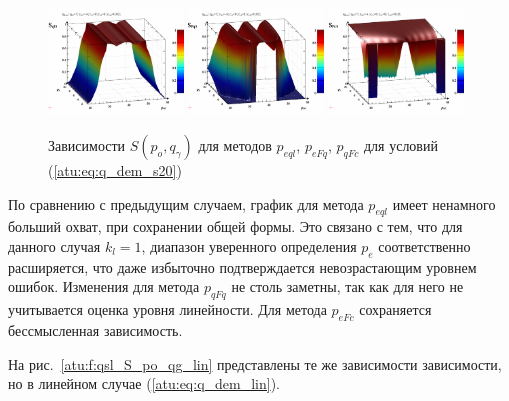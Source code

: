 \begin{figure}[htb!]
  \centerline{
    \includegraphics[width=0.32\textwidth]{p/qls_pe-p_po_qg_Sql_s20.png}
    \hfill
    \includegraphics[width=0.32\textwidth]{p/qls_pe-p_po_qg_SFq_s20.png}
    \hfill
    \includegraphics[width=0.32\textwidth]{p/qls_pe-p_po_qg_SFc_s20.png}
  }
  \caption{Зависимости $S(p_o,q_\gamma)$ для методов $p_{eql}$, $p_{eFq}$, $p_{qFc}$ для условий (\ref{atu:eq:q_dem_s20})}
  \label{atu:f:qsl_S_po_qg_s20}
\end{figure}

По сравнению с предыдущим случаем, график для метода $p_{eql}$
имеет ненамного больший охват, при сохранении общей формы.
Это связано с тем, что для данного случая $k_l=1$,
диапазон уверенного определения $p_e$ соответственно расширяется,
что даже избыточно подтверждается невозрастающим уровнем ошибок.
Изменения для метода $p_{qFq}$ не столь заметны,
так как для него не учитывается оценка уровня линейности.
Для метода $p_{eFc}$ сохраняется бессмысленная зависимость.

На рис.~\ref{atu:f:qsl_S_po_qg_lin} представлены те же зависимости зависимости,
но в линейном случае (\ref{atu:eq:q_dem_lin}).

